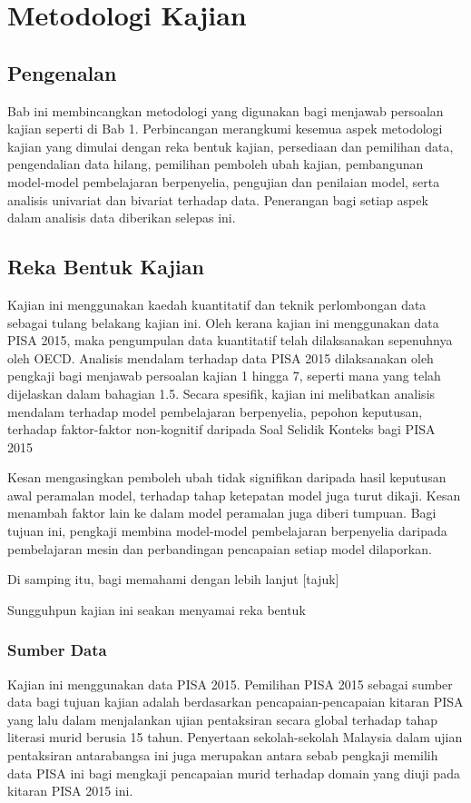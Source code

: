 \chapter{Metodologi Kajian}

\section{Pengenalan}
Bab ini membincangkan metodologi yang digunakan bagi menjawab persoalan kajian seperti di Bab 1. Perbincangan merangkumi kesemua aspek metodologi kajian yang dimulai dengan reka bentuk kajian, persediaan  dan pemilihan data, pengendalian data hilang,  pemilihan pemboleh ubah kajian, pembangunan model-model pembelajaran berpenyelia, pengujian dan penilaian model, serta analisis univariat dan bivariat terhadap data. Penerangan bagi setiap aspek dalam analisis data diberikan selepas ini. 

\section{Reka Bentuk Kajian}
Kajian ini menggunakan kaedah kuantitatif dan teknik perlombongan data sebagai tulang belakang kajian ini. Oleh kerana kajian ini menggunakan data PISA 2015, maka pengumpulan data kuantitatif telah dilaksanakan sepenuhnya oleh OECD. Analisis mendalam terhadap data PISA 2015 dilaksanakan oleh pengkaji bagi menjawab persoalan kajian 1 hingga 7, seperti mana yang telah dijelaskan dalam bahagian 1.5. Secara spesifik, kajian ini melibatkan analisis mendalam terhadap model pembelajaran berpenyelia, pepohon keputusan, terhadap faktor-faktor non-kognitif daripada Soal Selidik Konteks bagi PISA 2015

Kesan mengasingkan pemboleh ubah tidak signifikan daripada hasil keputusan awal peramalan model, terhadap tahap ketepatan model juga turut dikaji. Kesan menambah faktor lain ke dalam model peramalan juga diberi tumpuan. Bagi tujuan ini, pengkaji membina model-model pembelajaran berpenyelia daripada pembelajaran mesin dan perbandingan pencapaian setiap model dilaporkan.

Di samping itu, bagi memahami dengan lebih lanjut [tajuk]

Sungguhpun kajian ini seakan menyamai reka bentuk

\subsection{Sumber Data}
Kajian ini menggunakan data PISA 2015. Pemilihan PISA 2015 sebagai sumber data bagi tujuan kajian adalah berdasarkan pencapaian-pencapaian kitaran PISA yang lalu dalam menjalankan ujian pentaksiran secara global terhadap tahap literasi murid berusia 15 tahun. Penyertaan sekolah-sekolah Malaysia dalam ujian pentaksiran antarabangsa ini juga merupakan antara sebab pengkaji memilih data PISA ini bagi mengkaji pencapaian murid terhadap domain yang diuji pada kitaran PISA 2015 ini. 

